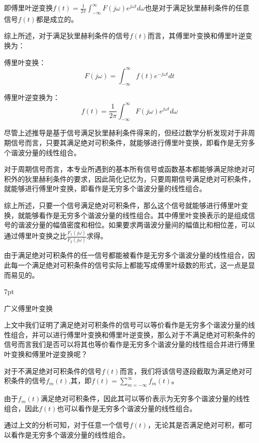 \documentclass{article}
\numberwithin{equation}{section}
\numberwithin{figure}{section}
\newenvironment{formal}{%
\def\FrameCommand{%
\hspace{1pt}%
{\color{DarkBlue}\vrule width 2pt}%
{\color{formalshade}\vrule width 4pt}%
\colorbox{formalshade}%
}%
\MakeFramed{\advance\hsize-\width\FrameRestore}%
\noindent\hspace{-4.55pt}%
\begin{adjustwidth}{}{7pt}%
\vspace{2pt}\vspace{2pt}%
}
{%
\vspace{2pt}\end{adjustwidth}\endMakeFramed%
}
\begin{document}
即傅里叶逆变换$f(t)=\frac{1}{2\pi}\int_{-\infty}^{\infty}F(j\omega)e^{j\omega t}d\omega$也是对于满足狄里赫利条件的任意信号$f(t)$都是成立的。

综上所述，对于满足狄里赫利条件的信号$f(t)$而言，其傅里叶变换和傅里叶逆变换为：

傅里叶变换：
\begin{equation}
    F(j\omega)=\int_{-\infty}^{\infty}f(t)e^{-j\omega t}dt
\end{equation}

傅里叶逆变换为：
\begin{equation}
    f(t)=\frac{1}{2\pi}\int_{-\infty}^{\infty}F(j\omega)e^{j\omega t}d\omega
\end{equation}

尽管上述推导是基于信号满足狄里赫利条件得来的，但经过数学分析发现对于非周期信号而言，只要其满足绝对可积条件，就能够进行傅里叶变换，即看作是无穷多个谐波分量的线性组合。

对于周期信号而言，本专业所遇到的基本所有信号或函数基本都能够满足除绝对可积外的狄里赫利条件的要求，因此简化记忆为，只要周期信号满足绝对可积条件，就能够进行傅里叶变换，即看作是无穷多个谐波分量的线性组合。

综上所述，只要一个信号满足绝对可积条件，那么这个信号就能够进行傅里叶变换，就能够看作是无穷多个谐波分量的线性组合。其中傅里叶变换表示的是组成信号的谐波分量的幅值密度和相位。如果要求两谐波分量间的幅值比和相位差，可以通过傅里叶变换之比$\frac{F_1{(j\omega)}}{F_2{(j\omega)}}$求得。

由于满足绝对可积条件的任一信号都能被看作是无穷多个谐波分量的线性组合，因此每一个满足绝对可积条件的信号实际上都能写成傅里叶级数的形式，这一点是显而易见的。

\begin{formal}
    广义傅里叶变换
\end{formal}

上文中我们证明了满足绝对可积条件的信号可以等价看作是无穷多个谐波分量的线性组合，并可以进行傅里叶变换和傅里叶逆变换，那么对于不满足绝对可积条件的信号而言我们是否可以将其也等价看作是无穷多个谐波分量的线性组合并进行傅里叶变换和傅里叶逆变换呢？

对于不满足绝对可积条件的信号$f(t)$而言，我们将该信号逐段截取为满足绝对可积条件的信号$f_m(t)$,其，即$f(t)=\sum_{m=-\infty}^{\infty}f_m(t)$。

由于$f_m(t)$满足绝对可积条件，因此其可以等价表示为无穷多个谐波分量的线性组合，因此$f(t)$也可以看作是无穷多个谐波分量的线性组合。

通过上文的分析可知，对于任意一个信号$f(t)$，无论其是否满足绝对可积，都可以看作是无穷多个谐波分量的线性组合。
\end{document}
